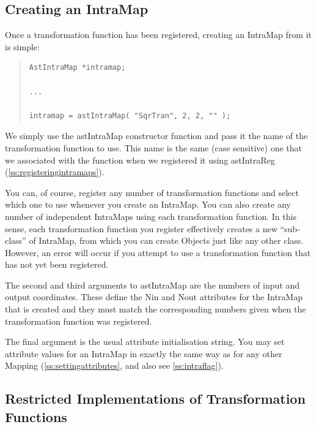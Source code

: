 \documentclass[twoside,11pt]{article}
\newcommand{\htmlref}[2]{#1}
\newcommand{\secref}[1]{\S\ref{#1}}
\renewcommand{\secref}[1]{\ref{#1}}
\begin{document}
\subsection{Creating an IntraMap}

Once a transformation function has been registered, creating an
\htmlref{IntraMap}{IntraMap} from it is simple:

\begin{quote}
\small
\begin{verbatim}
AstIntraMap *intramap;

...

intramap = astIntraMap( "SqrTran", 2, 2, "" );
\end{verbatim}
\normalsize
\end{quote}

We simply use the \htmlref{astIntraMap}{astIntraMap} constructor function and pass it the
name of the transformation function to use. This name is the same
(case sensitive) one that we associated with the function when we
registered it using \htmlref{astIntraReg}{astIntraReg} (\secref{ss:registeringintramaps}).

You can, of course, register any number of transformation functions
and select which one to use whenever you create an IntraMap. You can
also create any number of independent IntraMaps using each
transformation function. In this sense, each transformation function
you register effectively creates a new ``sub-class'' of IntraMap, from
which you can create Objects just like any other class. However, an
error will occur if you attempt to use a transformation function that
has not yet been registered.

The second and third arguments to astIntraMap are the numbers of input
and output coordinates. These define the \htmlref{Nin}{Nin} and \htmlref{Nout}{Nout} attributes for
the IntraMap that is created and they must match the corresponding
numbers given when the transformation function was registered.

The final argument is the usual attribute initialisation string. You
may set attribute values for an IntraMap in exactly the same way as
for any other \htmlref{Mapping}{Mapping} (\secref{ss:settingattributes}, and also see
\secref{ss:intraflag}).

\subsection{\label{ss:restrictedintramaps}Restricted Implementations of Transformation Functions}
\end{document}
